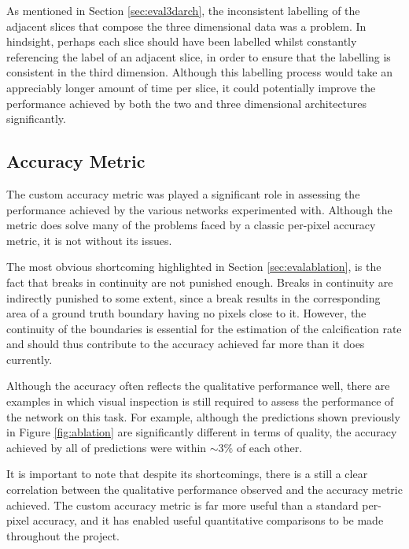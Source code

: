 As mentioned in Section \ref{sec:eval3darch}, the inconsistent labelling of the adjacent slices that compose the three dimensional data was a problem. In hindsight, perhaps each slice should have been labelled whilst constantly referencing the label of an adjacent slice, in order to ensure that the labelling is consistent in the third dimension. Although this labelling process would take an appreciably longer amount of time per slice, it could potentially improve the performance achieved by both the two and three dimensional architectures significantly.

\subsection{Accuracy Metric}
\label{sec:evalaccuracy}

The custom accuracy metric was played a significant role in assessing the performance achieved by the various networks experimented with. Although the metric does solve many of the problems faced by a classic per-pixel accuracy metric, it is not without its issues.

The most obvious shortcoming highlighted in Section \ref{sec:evalablation}, is the fact that breaks in continuity are not punished enough. Breaks in continuity are indirectly punished to some extent, since a break results in the corresponding area of a ground truth boundary having no pixels close to it. However, the continuity of the boundaries is essential for the estimation of the calcification rate and should thus contribute to the accuracy achieved far more than it does currently.

Although the accuracy often reflects the qualitative performance well, there are examples in which visual inspection is still required to assess the performance of the network on this task. For example, although the predictions shown previously in Figure \ref{fig:ablation} are significantly different in terms of quality, the accuracy achieved by all of predictions were within ${\sim}3\%$ of each other.

It is important to note that despite its shortcomings, there is a still a clear correlation between the qualitative performance observed and the accuracy metric achieved. The custom accuracy metric is far more useful than a standard per-pixel accuracy, and it has enabled useful quantitative comparisons to be made throughout the project.


